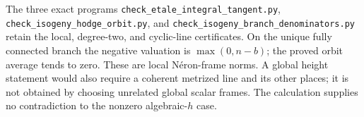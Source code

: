 The three exact programs
\texttt{check\_etale\_integral\_tangent.py},
\texttt{check\_isogeny\_hodge\_orbit.py}, and
\texttt{check\_isogeny\_branch\_denominators.py}
retain the local, degree-two, and cyclic-line certificates.
On the unique fully connected branch the negative valuation is
$\max(0,n-b)$; the proved orbit average tends to zero.
These are local N\'eron-frame norms. A global height statement would
also require a coherent metrized line and its other places; it is
not obtained by choosing unrelated global scalar frames.
The calculation supplies no contradiction to the nonzero
algebraic-$h$ case.
